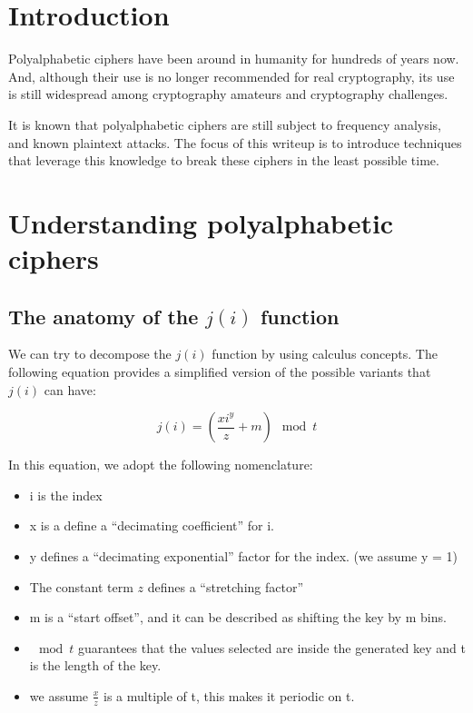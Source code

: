 \documentclass[pdftex,12pt,letter]{article}
\begin{document}

\newpage
\tableofcontents
\newpage

\section{Introduction}
Polyalphabetic ciphers have been around in humanity for hundreds of years now.
And, although their use is no longer recommended for real cryptography, its use
is still widespread among cryptography amateurs and cryptography
challenges.

It is known that polyalphabetic ciphers are still subject to frequency
analysis, and known plaintext attacks. The focus of this writeup is to
introduce techniques that leverage this knowledge to break these ciphers in the
least possible time.

\section{Understanding polyalphabetic ciphers}


\subsection{The anatomy of the $j(i)$ function}

We can try to decompose the $j(i)$ function by using calculus concepts. The
following equation provides a simplified version of the possible variants that
$j(i)$ can have:

\begin{equation}
    j(i) = \left( \frac{xi^y}{z} + m \right) \mod{t}
\end{equation}

In this equation, we adopt the following nomenclature:
\begin{itemize}
    \item i is the index
    \item x is a define a ``decimating coefficient'' for i.
    \item y defines a ``decimating exponential'' factor for the index. (we assume y = 1)
    \item The constant term $z$ defines a ``stretching factor''
    \item m is a ``start offset'', and it can be described as shifting the key by m bins.
    \item $\mod{t}$ guarantees that the values selected are inside the generated key and t is the length of the key.
    \item we assume $\frac{x}{z}$ is a multiple of t, this makes it periodic on t.
\end{itemize}
\end{document}
